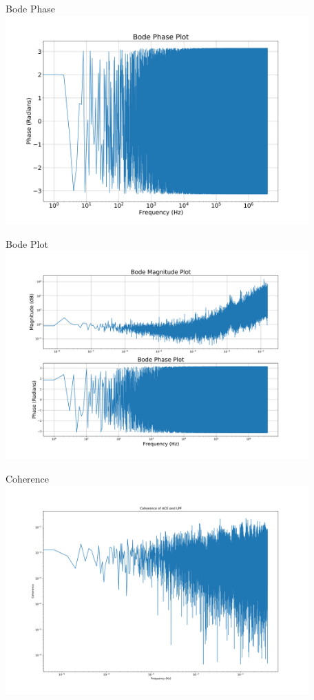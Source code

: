 \documentclass[aspectratio=169,xcolor=dvipsnames]{beamer}
\begin{document}
\begin{frame}{Bode Phase}
    \centering
    \includegraphics[height=8cm]{Bode_Phase_Plot-1.png}
\end{frame}
\fi
\begin{frame}{Bode Plot}
    \centering
    \includegraphics[height=8cm]{Bode_plot-1.png}
\end{frame}
\begin{frame}{Coherence}
    \centering
    \includegraphics[height=8cm]{ACE_and_LPF_co-1.png}
    \end{frame}
\end{document}
